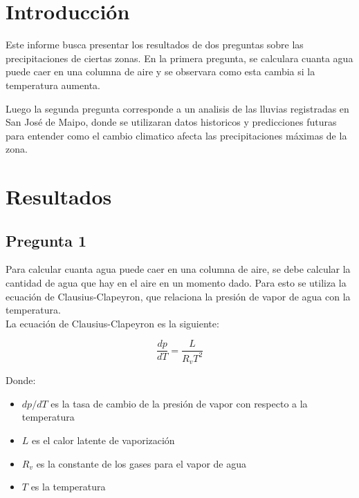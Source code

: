 \documentclass{article}  %
\begin{document}
\newpage
\thispagestyle{empty} %
\tableofcontents
\thispagestyle{plain} %
\thispagestyle{empty} %
\newpage

\setcounter{page}{1}
\section{Introducción}
Este informe busca presentar los resultados de dos preguntas sobre las precipitaciones de ciertas zonas. En la primera pregunta, se calculara cuanta agua puede caer en una columna de aire y se observara como esta cambia si la temperatura aumenta. 

Luego la segunda pregunta corresponde a un analisis de las lluvias registradas en San José de Maipo, donde se utilizaran datos historicos y predicciones futuras para entender como el cambio climatico afecta las precipitaciones máximas de la zona. 

\newpage
\section{Resultados}

\subsection{Pregunta 1}
Para calcular cuanta agua puede caer en una columna de aire, se debe calcular la cantidad de agua que hay en el aire en un momento dado. Para esto se utiliza la ecuación de Clausius-Clapeyron, que relaciona la presión de vapor de agua con la temperatura. \\
La ecuación de Clausius-Clapeyron es la siguiente:

\begin{equation}
    \frac{dp}{dT} = \frac{L}{R_vT^2}
\end{equation}

Donde:
\begin{itemize}
    \item $dp/dT$ es la tasa de cambio de la presión de vapor con respecto a la temperatura
    \item $L$ es el calor latente de vaporización
    \item $R_v$ es la constante de los gases para el vapor de agua
    \item $T$ es la temperatura
\end{itemize}
\end{document}
